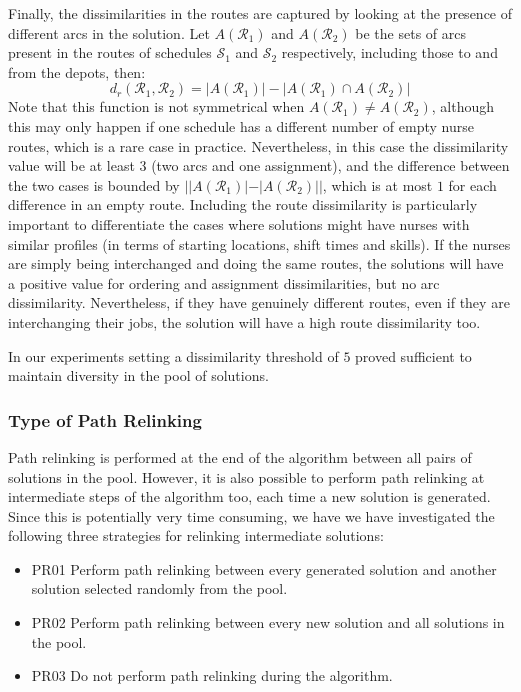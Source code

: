 \documentclass[a4paper,11pt]{elsarticle}
\begin{document}
Finally, the dissimilarities in the routes are captured by looking at the presence of different arcs in the solution. Let $A(\mathcal{R}_1)$ and $A(\mathcal{R}_2)$ be the sets of arcs present in the routes of schedules $\mathcal{S}_1$ and $\mathcal{S}_2$ respectively, including those to and from the depots, then:
\begin{equation}
    d_r(\mathcal{R}_1, \mathcal{R}_2) = |A(\mathcal{R}_1)| - |A(\mathcal{R}_1) \cap A(\mathcal{R}_2)|
\end{equation}
Note that this function is not symmetrical when $A(\mathcal{R}_1) \neq A(\mathcal{R}_2)$, although this may only happen if one schedule has a different number of empty nurse routes, which is a rare case in practice. Nevertheless, in this case the dissimilarity value will be at least $3$ (two arcs and one assignment), and the difference between the two cases is bounded by $||A(\mathcal{R}_1)| - |A(\mathcal{R}_2)||$, which is at most $1$ for each difference in an empty route. 
Including the route dissimilarity is particularly important to differentiate the cases where solutions might have nurses with similar profiles (in terms of starting locations, shift times and skills). If the nurses are simply being interchanged and doing the same routes, the solutions will have a positive value for ordering and assignment dissimilarities, but no arc dissimilarity. Nevertheless, if they have genuinely different routes, even if they are interchanging their jobs, the solution will have a high route dissimilarity too.

In our experiments setting a dissimilarity threshold of $5$ proved sufficient to maintain diversity in the pool of solutions.

\subsubsection{Type of Path Relinking}
Path relinking is performed at the end of the algorithm between all pairs of solutions in the pool. However, it is also possible to perform path relinking at intermediate steps of the algorithm too, each time a new solution is generated. Since this is potentially very time consuming, we have we have investigated the following three strategies for relinking intermediate solutions:
\begin{itemize}
    \item PR01 Perform path relinking between every generated solution and another solution selected randomly from the pool.
    \item PR02 Perform path relinking between every new solution and all solutions in the pool.
    \item PR03 Do not perform path relinking during the algorithm.
\end{itemize}
\end{document}
